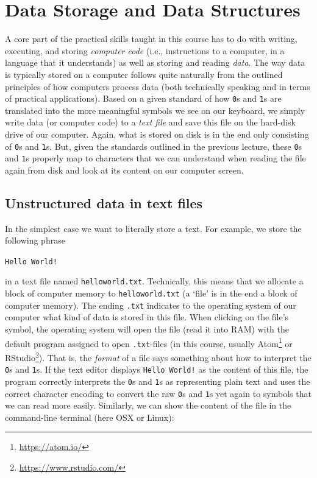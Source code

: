 \documentclass[
  12pt,
]{style/krantz}
\renewcommand{\href}[2]{#2\footnote{\url{#1}}}
\begin{document}
\hypertarget{data-storage-and-data-structures}{%
\chapter{Data Storage and Data Structures}\label{data-storage-and-data-structures}}

A core part of the practical skills taught in this course has to do with writing, executing, and storing \emph{computer code} (i.e., instructions to a computer, in a language that it understands) as well as storing and reading \emph{data}. The way data is typically stored on a computer follows quite naturally from the outlined principles of how computers process data (both technically speaking and in terms of practical applications). Based on a given standard of how \texttt{0}s and \texttt{1}s are translated into the more meaningful symbols we see on our keyboard, we simply write data (or computer code) to a \emph{text file} and save this file on the hard-disk drive of our computer. Again, what is stored on disk is in the end only consisting of \texttt{0}s and \texttt{1}s. But, given the standards outlined in the previous lecture, these \texttt{0}s and \texttt{1}s properly map to characters that we can understand when reading the file again from disk and look at its content on our computer screen.

\hypertarget{unstructured-data-in-text-files}{%
\section{Unstructured data in text files}\label{unstructured-data-in-text-files}}

In the simplest case we want to literally store a text. For example, we store the following phrase

\texttt{Hello\ World!}

in a text file named \texttt{helloworld.txt}. Technically, this means that we allocate a block of computer memory to \texttt{helloworld.txt} (a `file' is in the end a block of computer memory). The ending \texttt{.txt} indicates to the operating system of our computer what kind of data is stored in this file. When clicking on the file's symbol, the operating system will open the file (read it into RAM) with the default program assigned to open \texttt{.txt}-files (in this course, usually \href{https://atom.io/}{Atom} or \href{https://www.rstudio.com/}{RStudio}). That is, the \emph{format} of a file says something about how to interpret the \texttt{0}s and \texttt{1}s. If the text editor displays \texttt{Hello\ World!} as the content of this file, the program correctly interprets the \texttt{0}s and \texttt{1}s as representing plain text and uses the correct character encoding to convert the raw \texttt{0}s and \texttt{1}s yet again to symbols that we can read more easily. Similarly, we can show the content of the file in the command-line terminal (here OSX or Linux):
\end{document}
